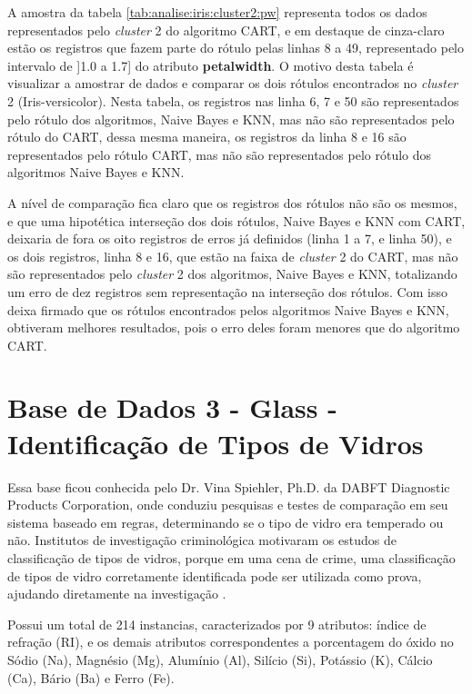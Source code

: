 A amostra da tabela \ref{tab:analise:iris:cluster2:pw} representa todos os dados representados pelo \textit{cluster} 2 do algoritmo CART, e em destaque de cinza-claro estão os registros que fazem parte do rótulo pelas linhas 8 a 49, representado pelo intervalo de ]1.0 a 1.7] do atributo \textbf{petalwidth}. O motivo desta tabela é visualizar  a amostrar de dados e comparar os dois rótulos encontrados no \textit{cluster} 2 (Iris-versicolor). Nesta tabela, os registros nas linha 6, 7 e 50 são representados pelo rótulo dos algoritmos, Naive Bayes e KNN, mas não são representados pelo rótulo do CART, dessa mesma maneira, os registros da linha 8 e 16 são representados pelo rótulo CART, mas não são representados pelo rótulo dos algoritmos Naive Bayes e KNN. 

A nível de comparação fica claro que os registros dos rótulos não são os mesmos, e que uma hipotética interseção dos dois rótulos, Naive Bayes e KNN com CART, deixaria de fora os oito registros de erros já definidos (linha 1 a 7, e linha 50), e os dois registros, linha 8 e 16, que estão na faixa de \textit{cluster} 2 do CART, mas não são representados pelo \textit{cluster} 2 dos algoritmos, Naive Bayes e KNN, totalizando um erro de dez registros sem representação na interseção dos rótulos. Com isso deixa firmado que os rótulos encontrados pelos algoritmos Naive Bayes e KNN, obtiveram melhores resultados, pois o erro deles foram menores que do algoritmo CART.

\section{Base de Dados 3 - Glass - Identificação de Tipos de Vidros}\label{cap:resultados:ssec:iris}

Essa base ficou conhecida pelo Dr. Vina Spiehler, Ph.D. da DABFT Diagnostic Products Corporation, onde conduziu pesquisas e testes de comparação em seu sistema baseado em regras, determinando se o tipo de vidro era temperado ou não. Institutos de investigação criminológica motivaram os estudos de classificação de tipos de vidros, porque em uma cena de crime, uma classificação de tipos de vidro corretamente identificada pode ser utilizada como prova, ajudando diretamente na investigação \cite{Evett:1989}.

Possui um total de 214 instancias, caracterizados por 9 atributos: índice de refração (RI), e os demais atributos correspondentes a porcentagem do óxido no Sódio (Na), Magnésio (Mg), Alumínio (Al), Silício (Si), Potássio (K), Cálcio (Ca), Bário (Ba) e Ferro (Fe).


